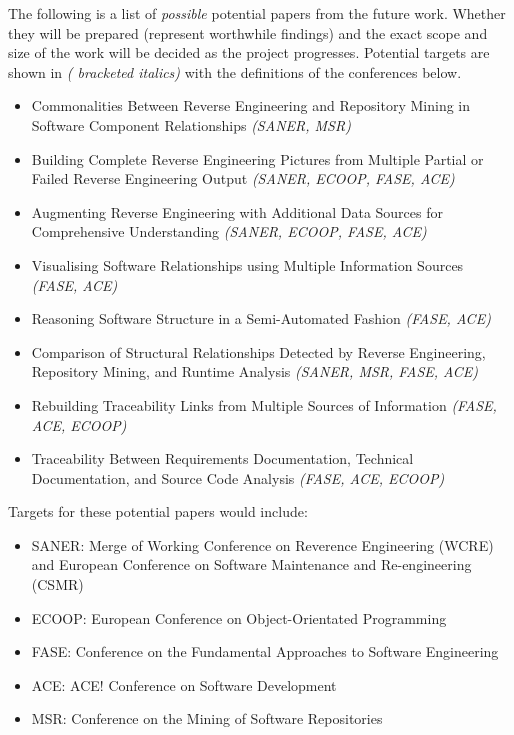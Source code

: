 The following is a list of \textit{possible} potential papers from the future work. Whether they will be prepared (represent worthwhile findings) and the exact scope and size of the work will be decided as the project progresses. Potential targets are shown in \textit{( bracketed italics)} with the definitions of the conferences below.

\begin{itemize}
\item Commonalities Between Reverse Engineering and Repository Mining in Software Component Relationships \textit{(SANER, MSR)}
\item Building Complete Reverse Engineering Pictures from Multiple Partial or Failed Reverse Engineering Output \textit{(SANER, ECOOP, FASE, ACE)}
\item Augmenting Reverse Engineering with Additional Data Sources for Comprehensive Understanding \textit{(SANER, ECOOP, FASE, ACE)}
\item Visualising Software Relationships using Multiple Information Sources \textit{(FASE, ACE)}
\item Reasoning Software Structure in a Semi-Automated Fashion \textit{(FASE, ACE)}
\item Comparison of Structural Relationships Detected by Reverse Engineering, Repository Mining, and Runtime Analysis \textit{(SANER, MSR, FASE, ACE)}
\item Rebuilding Traceability Links from Multiple Sources of Information \textit{(FASE, ACE, ECOOP)}
\item Traceability Between Requirements Documentation, Technical Documentation, and Source Code Analysis \textit{(FASE, ACE, ECOOP)}
\end{itemize}

Targets for these potential papers would include:

\begin{itemize}
\item SANER: Merge of Working Conference on Reverence Engineering (WCRE) and European Conference on Software Maintenance and Re-engineering (CSMR)
\item ECOOP: European Conference on Object-Orientated Programming
\item FASE: Conference on the Fundamental Approaches to Software Engineering
\item ACE: ACE! Conference on Software Development
\item MSR: Conference on the Mining of Software Repositories
\end{itemize}